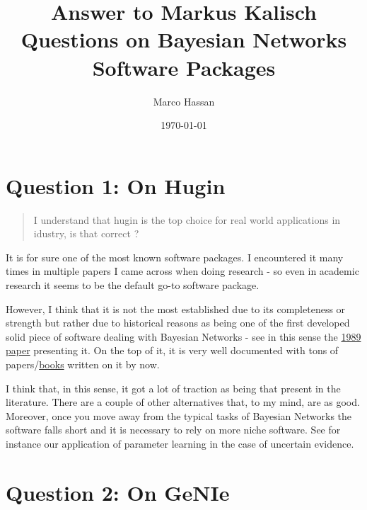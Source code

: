 \documentclass[a4paper]{article}
\author{Marco Hassan}
\date{\today}
\title{Answer to Markus Kalisch Questions on Bayesian Networks Software Packages}
\begin{document}
\maketitle
\setlength\parindent{0pt}

\section{Question 1: On Hugin}
\label{sec:org80d48e4}

\begin{quote}
I understand that hugin is the top choice for real world
applications in idustry, is that correct ?
\end{quote}

It is for sure one of the most known software packages. I
encountered it many times in multiple papers I came across when
doing research - so even in academic research it seems to be the
default go-to software package.

However, I think that it is not the most established due to its
completeness or strength but rather due to historical reasons as
being one of the first developed solid piece of software dealing
with Bayesian Networks - see in this sense the \href{https://d1wqtxts1xzle7.cloudfront.net/49642660/HUGIN\_-\_A\_Shell\_for\_Building\_Bayesian\_Be20161016-6003-9fm92w.pdf?1476636550=\&response-content-disposition=inline\%3B+filename\%3DHUGIN\_A\_Shell\_for\_Building\_Bayesian\_Beli.pdf\&Expires=1629908608\&Signature=bhntyNgHmv2Mq-QgPlJOeOObSPuVYVft5MJ0UckslCY8wU80gRSEgFJ63-TNFAj4Wz3HdaqYSv4AkrGKOvH0obgO-FdGYXV8vp\~ve6thEpUAK2M7bD\~F-JNV82h33wd1exhZS03a9JYjt7nRI52q7VokU8h9XOqBKuWZcBT80zOWPWrzp4Y5pTK2-2MFeWfua8iuEDH97ljdHhFe3z\~dOn4SvJ-Afnl\~N7v-jjtevpgME3HLjcTZ23ITUHa8LTP85CatjPT\~i5cFkvA8kxStu-7LkgvqFydLGN-UEdlnkCwGRRrhMuT0WRzLCw\~wjJnukGYQS4Gic\~T4uhISqSUiGQ\_\_\&Key-Pair-Id=APKAJLOHF5GGSLRBV4ZA}{1989 paper} presenting
it. On the top of it, it is very well documented with tons of
papers/\href{https://link.springer.com/chapter/10.1007/978-3-540-45062-7\_49}{books} written on it by now.

I think that, in this sense, it got a lot of traction as being that
present in the literature. There are a couple of other alternatives
that, to my mind, are as good. Moreover, once you move away from the
typical tasks of Bayesian Networks the software falls short and it
is necessary to rely on more niche software. See for instance our
application of parameter learning in the case of uncertain evidence.


\section{Question 2: On GeNIe}
\label{sec:org90c161e}
\end{document}
